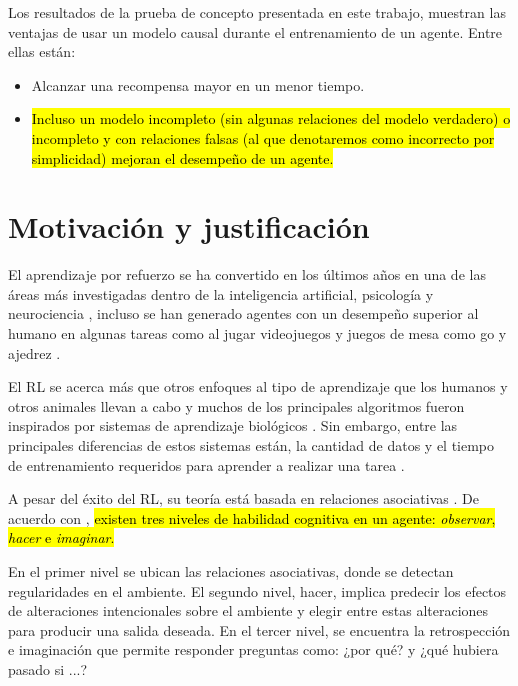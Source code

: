Los resultados de la prueba de concepto presentada en este trabajo, 
muestran las ventajas de usar un modelo causal durante el entrenamiento de un agente. Entre ellas están: 
\begin{itemize}
    \item Alcanzar una recompensa mayor en un menor tiempo.
    \item \hl{Incluso un modelo incompleto (sin algunas relaciones del modelo verdadero) o incompleto y con relaciones falsas (al que denotaremos como incorrecto por simplicidad) mejoran el desempeño de un agente.}
\end{itemize}

\section{Motivación y justificación}


El aprendizaje por refuerzo se ha convertido en los últimos años en una de las áreas
más investigadas dentro de la inteligencia artificial, psicología y neurociencia \cite{botvinick2019reinforcement}, incluso
se han generado agentes con un desempeño superior al humano en algunas tareas como  al jugar videojuegos \cite{mnih2015human, starcraft2019deepmind} y juegos de mesa como go y ajedrez \cite{Silver1140}.

El RL se acerca más que otros enfoques al tipo de aprendizaje que los humanos y otros
animales llevan a cabo y muchos de los principales algoritmos fueron inspirados por 
sistemas de aprendizaje biológicos \cite{sutton_barto_2018}. Sin embargo,
entre las principales diferencias de estos sistemas 
están, la cantidad de datos y el tiempo de entrenamiento
requeridos para aprender a realizar una tarea \cite{Silver1140}.

A pesar del éxito del RL, su teoría está basada 
en relaciones asociativas \cite{playingagainstnature2018}.
De acuerdo con \cite{pearl2018bookofwhy}, \hl{existen tres niveles de
habilidad cognitiva en un agente: \textit{observar}, \textit{hacer} e \textit{imaginar}.}

En el primer nivel se ubican las 
relaciones asociativas, donde se detectan regularidades
en el ambiente.
El segundo nivel, hacer, implica predecir los 
efectos de alteraciones intencionales sobre el ambiente
y elegir entre estas alteraciones  para producir una
salida deseada. En el tercer nivel, se encuentra
la retrospección e imaginación que
permite responder preguntas como: ¿por qué?
y ¿qué hubiera pasado si ...?

